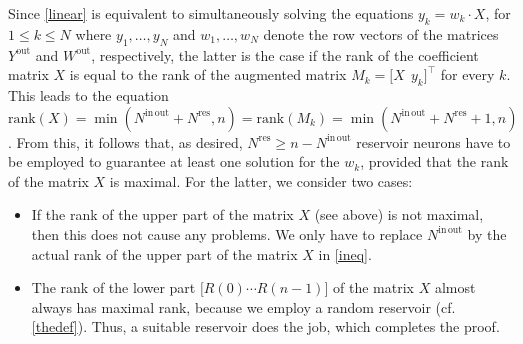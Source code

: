 \documentclass[preprint,12pt,times,authoryear]{elsarticle}%
\theoremstyle{definition}
\begin{document}
Since \cref{linear} is equivalent to simultaneously solving the equations $y_k =
w_k \cdot X$, for $1 \le k \le N$ where $y_1,\dots,y_N$ and $w_1,\dots,w_N$
denote the row vectors of the matrices $Y^\mathrm{out}$ and $W^\mathrm{out}$,
respectively, the latter is the case if the rank of the coefficient matrix $X$
is equal to the rank of the augmented matrix $M_k = \big[ X ~~ y_k \big]^\top$
for every $k$. This leads to the equation $\mathrm{rank}(X) =
\min(N^\mathrm{in\,out}+N^\mathrm{res},n) = \mathrm{rank}(M_k) =
\min(N^\mathrm{in\,out}+N^\mathrm{res}+1,n)$. From this, it follows that, as
desired, $N^\mathrm{res} \ge n-N^\mathrm{in\,out}$ reservoir neurons have to be
employed to guarantee at least one solution for the $w_k$, provided that the
rank of the matrix $X$ is maximal. For the latter, we consider two cases:
\begin{itemize}
  \item If the rank of the upper part of the matrix $X$ (see above) is not
	maximal, then this does not cause any problems. We only have to replace
	$N^\mathrm{in\,out}$ by the actual rank of the upper part of the matrix
	$X$ in \cref{ineq}.
  \item The rank of the lower part $\big[ R(0) \cdots R(n-1) \big]$ of the
	matrix $X$ almost always has maximal rank, because we employ a random
	reservoir (cf. \cref{thedef}). Thus, a suitable reservoir does the job,
	which completes the proof.
\end{itemize}
\end{document}
